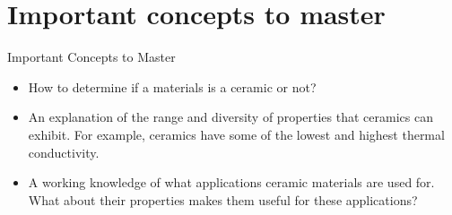 \documentclass{libs/XJTLU_format}
\begin{document}
\section{Important concepts to master}
\begin{frame}{Important Concepts to Master}
\begin{itemize}
    \item How to determine if a materials is a ceramic or not? \pause
    \item An explanation of the range and diversity of properties that ceramics can exhibit. For example, ceramics have some of the lowest and highest thermal conductivity.  \pause
    \item A working knowledge of what applications ceramic materials are used for. What about their properties makes them useful for these applications? 
\end{itemize}
\end{frame}
\end{document}
